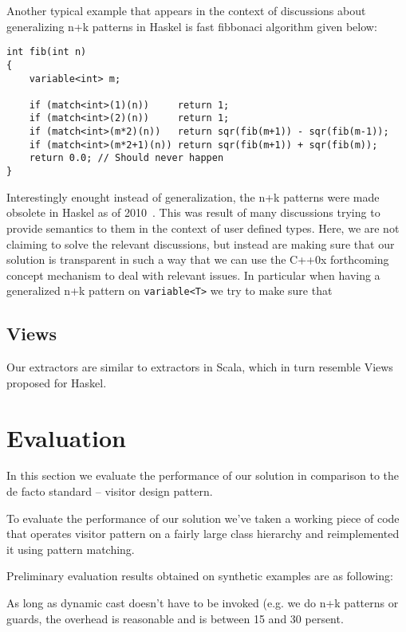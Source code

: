\documentclass[submission,copyright]{eptcs}
\DeclareRobustCommand{\code}[1]{{\lstinline[breaklines=false]{#1}}}
\begin{document}
Another typical example that appears in the context of discussions about 
generalizing n+k patterns in Haskel is fast fibbonaci algorithm given below:

\begin{lstlisting}
int fib(int n)
{
    variable<int> m;

    if (match<int>(1)(n))     return 1;
    if (match<int>(2)(n))     return 1;
    if (match<int>(m*2)(n))   return sqr(fib(m+1)) - sqr(fib(m-1));
    if (match<int>(m*2+1)(n)) return sqr(fib(m+1)) + sqr(fib(m));
    return 0.0; // Should never happen
}
\end{lstlisting}

Interestingly enought instead of generalization, the n+k patterns were made 
obsolete in Haskel as of 2010~\cite{HaskelDocMakingThis}. This was result of 
many discussions trying to provide semantics to them in the context of user 
defined types. Here, we are not claiming to solve the relevant discussions, but 
instead are making sure that our solution is transparent in such a way that we 
can use the C++0x forthcoming concept mechanism to deal with relevant issues. In 
particular when having a generalized n+k pattern on \code{variable<T>} we try to make 
sure that 

\subsection{Views}

Our extractors are similar to extractors in Scala, which in turn resemble Views 
proposed for Haskel.

\section{Evaluation} %
\label{sec:ev}

In this section we evaluate the performance of our solution in comparison to the 
de facto standard -- visitor design pattern.

To evaluate the performance of our solution we've taken a working piece of code 
that operates visitor pattern on a fairly large class hierarchy and 
reimplemented it using pattern matching.

Preliminary evaluation results obtained on synthetic examples are as following:

As long as dynamic cast doesn't have to be invoked (e.g. we do n+k patterns or 
guards, the overhead is reasonable and is between 15 and 30 persent.
\end{document}
